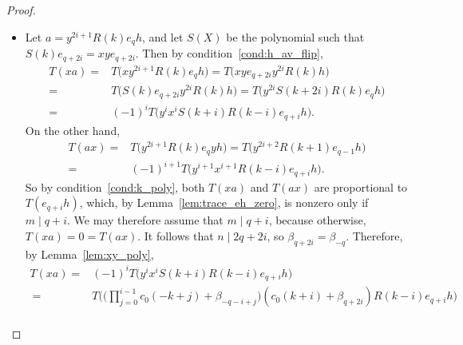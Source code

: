 \documentclass[10pt,a4paper]{amsart}
\begin{document}
\begin{proof}
\begin{itemize}
\begin{align*}
 e_{q - i} h \bigr) \\
 ={}& T\bigl( x^{i - 1} (xy) y^{i - 1} R(k + i)
 e_{q - i} h \bigr) = T\bigl( x^{i - 1} (xy) y^{i - 1}
 e_{q - i} R(k + i) h \bigr) \\
 ={}& T\bigl( x^{i - 1} (xy) e_{q - 1} y^{i - 1}
 R(k + i) h\bigr) = T\bigl( x^{i - 1} S(k) e_{q - 1} y^{i - 1}
 R(k + i) h \bigr) \\
 ={}& T\bigl( x^{i - 1} y^{i - 1}
 S(k + i - 1) R(k + i) e_{q - i} h\bigr) = T\bigl( x^{2i - 2} S(k)
 R(k + 1) e_{q - 1} h \bigr) \\
 ={}& T\bigl( x^{2i - 2} (xy)
 R(k + 1) e_{q - 1} h \bigr) = T\bigl( x^{2i - 1}
 R(k) e_q y h \bigr) \\
 ={}& T\bigl(x^{2i - 1} R(k) e_q h x\bigr) = T(ax),
 \end{align*}
 as needed.
 \item Let $a = y^{2i + 1} R(k) e_q h$,
 and let $S(X)$ be the polynomial
 such that $S(k) e_{q + 2i} = xy e_{q + 2i}$.
 Then by condition~\ref{cond:h_av_flip},
 \begin{align*}
 T(xa) ={}& T\bigl( x y^{2i + 1}
 R(k) e_q h \bigr) = T\bigl( xy e_{q + 2i} y^{2i}
 R(k) h \bigr) \\
 ={}& T\bigl( S(k) e_{q + 2i} y^{2i}
 R(k) h \bigr) = T\bigl( y^{2i}
 S(k + 2i) R(k) e_q h \bigr) \\
 ={}& (-1)^i T\bigl( y^i x^i
 S(k + i) R(k - i) e_{q + i} h \bigr).
 \end{align*}
 On the other hand,
 \begin{align}
 T(ax) ={}& T\bigl( y^{2i + 1}
 R(k) e_q y h \bigr) = T\bigl( y^{2i + 2}
 R(k + 1) e_{q - 1} h \bigr) \nonumber\\
 ={}& (-1)^{i + 1} T\bigl( y^{i + 1} x^{i + 1}
 R(k - i) e_{q + i} h \bigr).\label{eq:t_ax}
 \end{align}
 So by condition~\ref{cond:k_poly},
 both $T(xa)$ and $T(ax)$
 are proportional to $T(e_{q + i} h)$,
 which, by Lemma~\ref{lem:trace_eh_zero},
 is nonzero only if $m \mid q + i$.
 We may therefore assume that $m \mid q + i$,
 because otherwise, $T(xa) = 0 = T(ax)$.
 It follows that $n \mid 2q + 2i$,
 so $\beta_{q + 2i} = \beta_{-q}$.
 Therefore, by Lemma~\ref{lem:xy_poly},
 \begin{align*}
 T(xa)
 ={}& (-1)^i T\bigl( y^i x^i
 S(k + i) R(k - i) e_{q + i} h \bigr) \\\
 ={}& T\Bigg( \Bigg(
 \prod\limits_{j = 0}^{i - 1}
 c_0 (-k + j) + \beta_{-q - i + j}
 \Bigg)
( c_0 (k + i) + \beta_{q + 2i})
 R(k - i) e_{q + i} h \Bigg) \\

\end{align*}
\end{itemize}
\end{proof}
\end{document}
